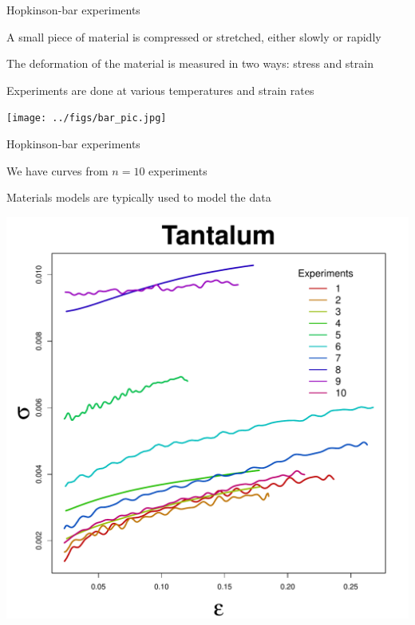 \documentclass[mathserif, 12pt, t]{beamer}
\begin{document}
\begin{frame}{Hopkinson-bar experiments}

\begin{minipage}{0.50\textwidth}
A small piece of material is compressed or stretched, either slowly or rapidly
\bigskip

The deformation of the material is measured in two ways: stress and strain
\bigskip

Experiments are done at various temperatures and strain rates
\end{minipage}
\begin{minipage}{0.45\textwidth}
\begin{flushright}
\texttt{[image: ../figs/bar\_pic.jpg]}
\end{flushright}
\end{minipage}

\end{frame}

\begin{frame}{Hopkinson-bar experiments}

\begin{minipage}{0.50\textwidth}
We have curves from $n=10$ experiments
\bigskip

Materials models are typically used to model the data
\bigskip

\end{minipage}
\begin{minipage}{0.45\textwidth}
\begin{flushright}
\includegraphics[scale=0.25]{../figs/ta_all_data.pdf}
\end{flushright}
\end{minipage}

\end{frame}
\end{document}
